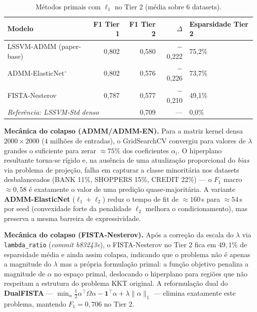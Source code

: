 \documentclass[12pt,a4paper]{article}
\begin{document}
\begin{table}[H]
\centering
\caption{Métodos primais com $\ell_1$ no Tier 2 (média sobre 6 datasets).}
\label{tab:primal_collapse}
\begin{tabular}{lrrrl}
\toprule
\textbf{Modelo} & \textbf{F1 Tier 1} & \textbf{F1 Tier 2} & \textbf{$\Delta$} & \textbf{Esparsidade Tier 2} \\
\midrule
LSSVM-ADMM (paper-base)  & 0,802 & 0,580 & $-$0,222 & 75,2\% \\
ADMM-ElasticNet$^\circ$ & 0,802 & 0,576 & $-$0,226 & 73,7\% \\
FISTA-Nesterov           & 0,787 & 0,577 & $-$0,210 & 49,1\% \\
\midrule
\multicolumn{2}{l}{\textit{Referência: LSSVM-Std denso}} & 0,709 & ---       & 0,0\% \\
\bottomrule
\end{tabular}
\end{table}

\textbf{Mecânica do colapso (ADMM/ADMM-EN).} Para a matriz kernel densa
$2000 \times 2000$ ($4$ milhões de entradas), o GridSearchCV convergiu para
valores de $\lambda$ grandes o suficiente para zerar $\approx 75\%$ dos
coeficientes $\alpha_i$. O hiperplano resultante torna-se rígido e, na
ausência de uma atualização proporcional do \emph{bias} via problema de
projeção, falha em capturar a classe minoritária nos datasets desbalanceados
(BANK 11\%, SHOPPERS 15\%, CREDIT 22\%) --- o $F_1$ macro $\approx 0{,}58$ é
exatamente o valor de uma predição quase-majoritária. A variante
\textbf{ADMM-ElasticNet} ($\ell_1 + \ell_2$) reduz o tempo de fit de
$\approx 160$\,s para $\approx 54$\,s por seed (convexidade forte da
penalidade $\ell_2$ melhora o condicionamento), mas preserva a mesma
barreira de expressividade.

\textbf{Mecânica do colapso (FISTA-Nesterov).} Após a correção da escala
do $\lambda$ via \texttt{lambda\_ratio} (\emph{commit b83243e}), o
FISTA-Nesterov no Tier 2 fica em $49{,}1\%$ de esparsidade média e ainda
assim colapsa, indicando que o problema não é apenas a magnitude do
$\lambda$ mas a própria formulação primal: a função objetivo penaliza a
magnitude de $\alpha$ no espaço primal, deslocando o hiperplano para
regiões que não respeitam a estrutura do problema KKT original. A
reformulação dual do \textbf{DualFISTA} ---
$\min_\alpha \tfrac{1}{2}\alpha^\top\Omega\alpha - \mathbf{1}^\top\alpha + \lambda\|\alpha\|_1$ ---
elimina exatamente este problema, mantendo $F_1 = 0{,}706$ no Tier 2.
\end{document}
